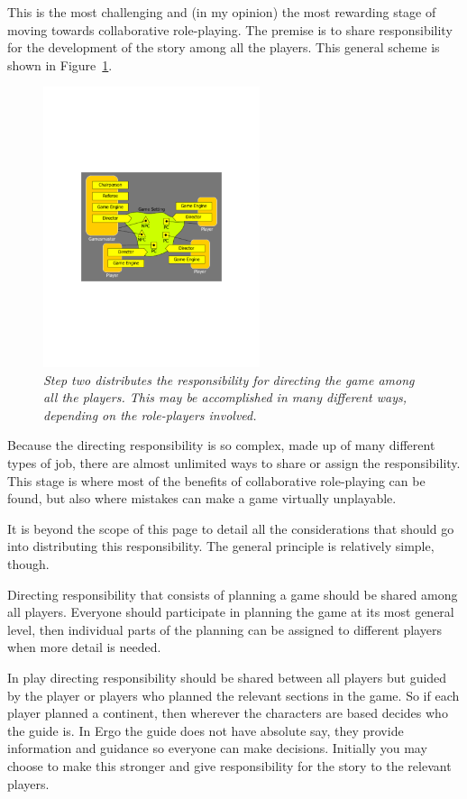 \documentclass[twoside]{book}
\begin{document}
This is the most challenging and (in my opinion) the most rewarding stage of moving towards collaborative role-playing. The premise is to share responsibility for the development of the story among all the players. This general scheme is shown in Figure~\ref{fig-distributes}.
\begin{figure}[!htb]
\centering
\includegraphics[width=2.5in]{collaborate_figure3}
\caption{\it Step two distributes the responsibility for directing the game among all the players. This may be accomplished in many different ways, depending on the role-players involved.}
\label{fig-distributes}
\end{figure}
Because the directing responsibility is so complex, made up of many different types of job, there are almost unlimited ways to share or assign the responsibility. This stage is where most of the benefits of collaborative role-playing can be found, but also where mistakes can make a game virtually unplayable.

It is beyond the scope of this page to detail all the considerations that should go into distributing this responsibility. The general principle is relatively simple, though.

Directing responsibility that consists of planning a game should be shared among all players. Everyone should participate in planning the game at its most general level, then individual parts of the planning can be assigned to different players when more detail is needed.

In play directing responsibility should be shared between all players but guided by the player or players who planned the relevant sections in the game. So if each player planned a continent, then wherever the characters are based decides who the guide is. In Ergo the guide does not have absolute say, they provide information and guidance so everyone can make decisions. Initially you may choose to make this stronger and give responsibility for the story to the relevant players.
\end{document}
